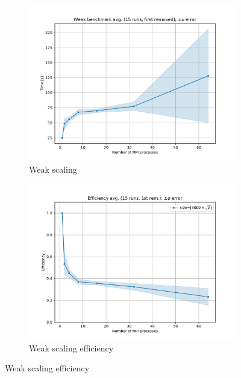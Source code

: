 \documentclass[unicode,11pt,a4paper,oneside,numbers=endperiod,openany]{scrartcl}
\begin{document}
\begin{figure}
      \begin{subfigure}{.5\textwidth}
            \centering
            \includegraphics[width=1\linewidth]{plots/power_weak_scaling.pdf}
            \caption{Weak scaling}
            \label{fig:powermethod_weak}
      \end{subfigure}
      \begin{subfigure}{.5\textwidth}
            \centering
            \includegraphics[width=1\linewidth]{plots/power_weak_scaling_efficiency.pdf}
            \caption{Weak scaling efficiency}
            \label{fig:powermethod_efficiency}
      \end{subfigure}
\end{figure}
\end{document}
